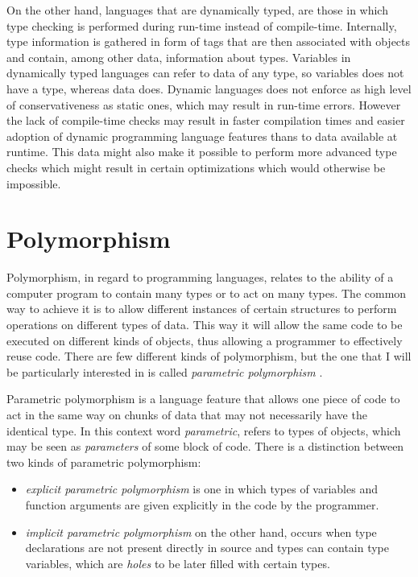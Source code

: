 \documentclass[12pt,a4paper]{report}
\begin{document}
On the other hand, languages that are dynamically typed, are those in which
type checking is performed during run-time instead of compile-time. Internally,
type information is gathered in form of tags that are then associated with
objects and contain, among other data, information about types. Variables in
dynamically typed languages can refer to data of any type, so variables does
not have a type, whereas data does. Dynamic languages does not enforce as high
level of conservativeness as static ones, which may result in run-time errors.
However the lack of compile-time checks may result in faster compilation times
and easier adoption of dynamic programming language features thans to data
available at runtime. This data might also make it possible to perform more
advanced type checks which might result in certain optimizations which would
otherwise be impossible.

\section{Polymorphism}
Polymorphism, in regard to programming languages, relates to the ability of a
computer program to contain many types or to act on many types. The common way
to achieve it is to allow different instances of certain structures to perform
operations on different types of data. This way it will allow the same code to
be executed on different kinds of objects, thus allowing a programmer to
effectively reuse code. There are few different kinds of polymorphism, but the
one that I will be particularly interested in is called \textit{parametric
polymorphism} \cite{Car88}.

Parametric polymorphism is a language feature that allows one piece of code to
act in the same way on chunks of data that may not necessarily have the
identical type. In this context word \textit{parametric}, refers to types of
objects, which may be seen as \textit{parameters} of some block of code. There is a
distinction between two kinds of parametric polymorphism:

\begin{itemize}
  \item \textit{explicit parametric polymorphism} is one in which types of
    variables and function arguments are given explicitly in the code by the
    programmer.
  \item \textit{implicit parametric polymorphism} on the other hand, occurs
    when type declarations are not present directly in source and types can
    contain type variables, which are \textit{holes} to be later filled with certain
    types.
\end{itemize}
\end{document}
